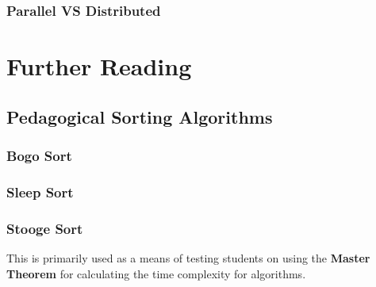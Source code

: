 \subsubsection{Parallel VS Distributed}




\section{Further Reading}

\subsection{Pedagogical Sorting Algorithms}

\subsubsection{Bogo Sort}
\subsubsection{Sleep Sort}
\subsubsection{Stooge Sort}

This is primarily used as a means of testing students on using the \textbf{Master Theorem} for calculating the time complexity for algorithms.

